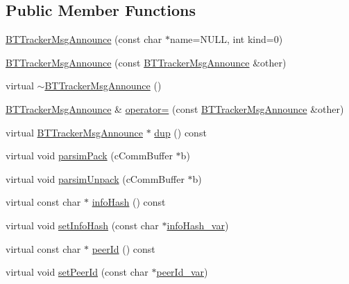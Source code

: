 \subsection*{Public Member Functions}
\begin{DoxyCompactItemize}
\item 
\hyperlink{classBTTrackerMsgAnnounce_a006351da6f99e4f73785cad49b5aecfa}{B\+T\+Tracker\+Msg\+Announce} (const char $\ast$name=N\+U\+L\+L, int kind=0)
\item 
\hyperlink{classBTTrackerMsgAnnounce_aba77a16bcb9bef02a2fdb5e2d04a9902}{B\+T\+Tracker\+Msg\+Announce} (const \hyperlink{classBTTrackerMsgAnnounce}{B\+T\+Tracker\+Msg\+Announce} \&other)
\item 
virtual \hyperlink{classBTTrackerMsgAnnounce_adaf5432a83e4311ef137e4b3260a0b22}{$\sim$\+B\+T\+Tracker\+Msg\+Announce} ()
\item 
\hyperlink{classBTTrackerMsgAnnounce}{B\+T\+Tracker\+Msg\+Announce} \& \hyperlink{classBTTrackerMsgAnnounce_ade1e515aa0cf6a0890cd6a504bae43c8}{operator=} (const \hyperlink{classBTTrackerMsgAnnounce}{B\+T\+Tracker\+Msg\+Announce} \&other)
\item 
virtual \hyperlink{classBTTrackerMsgAnnounce}{B\+T\+Tracker\+Msg\+Announce} $\ast$ \hyperlink{classBTTrackerMsgAnnounce_ae71c93192d9643deca2df1d2509abc81}{dup} () const 
\item 
virtual void \hyperlink{classBTTrackerMsgAnnounce_aff2342db405a7679f229c479c11f46b4}{parsim\+Pack} (c\+Comm\+Buffer $\ast$b)
\item 
virtual void \hyperlink{classBTTrackerMsgAnnounce_aca0e70bb2c37f8c71ade83831a7c35d3}{parsim\+Unpack} (c\+Comm\+Buffer $\ast$b)
\item 
virtual const char $\ast$ \hyperlink{classBTTrackerMsgAnnounce_ab310c662c11b529992a367a2e1b15b3c}{info\+Hash} () const 
\item 
virtual void \hyperlink{classBTTrackerMsgAnnounce_a766f9fb2b4b0679952916eadf415613f}{set\+Info\+Hash} (const char $\ast$\hyperlink{classBTTrackerMsgAnnounce_af774e44908377e324fd25e16a048c184}{info\+Hash\+\_\+var})
\item 
virtual const char $\ast$ \hyperlink{classBTTrackerMsgAnnounce_a69a230f6640baf0ea5450636e180e320}{peer\+Id} () const 
\item 
virtual void \hyperlink{classBTTrackerMsgAnnounce_ad678c6f0881dce090eeec1e4793e596e}{set\+Peer\+Id} (const char $\ast$\hyperlink{classBTTrackerMsgAnnounce_afdb278a71653823706ad6b925a03711e}{peer\+Id\+\_\+var})
\item 

\end{DoxyCompactItemize}
